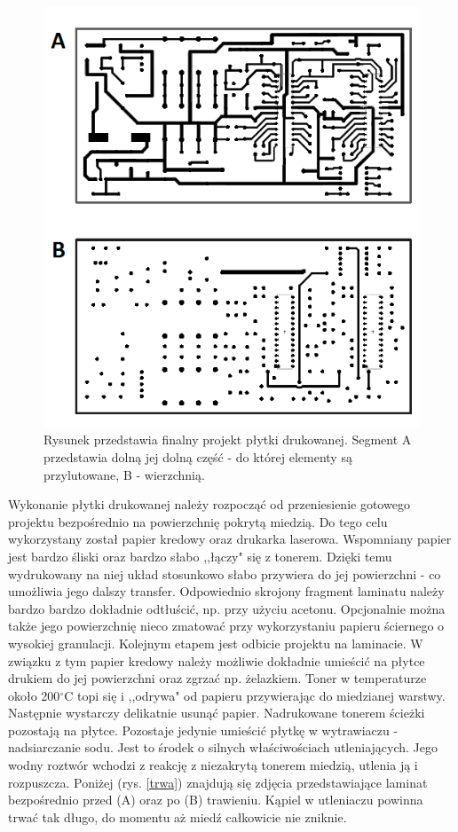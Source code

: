    \begin{figure}[H]
    \begin{center}
      \includegraphics[scale=0.7]{imgs/plytka.png}
 	\caption[Projekt płytki drukowanej.]{\small{Rysunek przedstawia finalny projekt płytki drukowanej. Segment A przedstawia dolną jej dolną część - do której elementy są przylutowane, B - wierzchnią. }}
	\label{plyta}
    \end{center}
  \end{figure}   
Wykonanie płytki drukowanej należy rozpocząć od przeniesienie gotowego projektu bezpośrednio na powierzchnię pokrytą miedzią. Do tego celu wykorzystany został papier kredowy oraz drukarka laserowa. Wspomniany papier jest bardzo śliski oraz bardzo słabo ,,łączy" się z tonerem. Dzięki temu wydrukowany na niej układ stosunkowo słabo przywiera do jej powierzchni - co umożliwia jego dalszy transfer. Odpowiednio skrojony fragment laminatu należy bardzo bardzo dokładnie odtłuścić, np. przy użyciu acetonu. Opcjonalnie można także jego powierzchnię nieco zmatować przy wykorzystaniu papieru ściernego o wysokiej granulacji. Kolejnym etapem jest odbicie projektu na laminacie. W związku z tym papier kredowy należy możliwie dokładnie umieścić na płytce drukiem do jej powierzchni oraz zgrzać np. żelazkiem. Toner w temperaturze około 200$^\circ$C topi się i ,,odrywa" od papieru przywierając do miedzianej warstwy. Następnie wystarczy delikatnie usunąć papier. Nadrukowane tonerem ścieżki pozostają na płytce. Pozostaje jedynie umieścić płytkę w wytrawiaczu - nadsiarczanie sodu. Jest to środek o silnych właściwościach utleniających. Jego wodny roztwór wchodzi z reakcję z niezakrytą tonerem miedzią, utlenia ją i rozpuszcza.  Poniżej (rys. \ref{trwa}) znajdują się zdjęcia przedstawiające laminat bezpośrednio przed (A) oraz po (B) trawieniu. Kąpiel w utleniaczu powinna trwać tak długo, do momentu aż miedź całkowicie nie zniknie.

